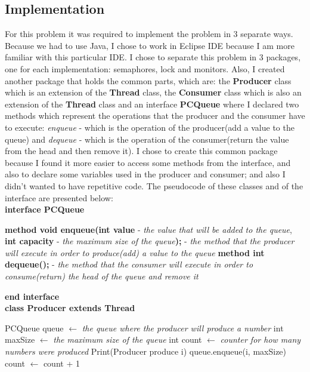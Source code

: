 \documentclass[14pt]{article}
\begin{document}
\subsection{Implementation}
For this problem it was required to implement the problem in 3 separate ways. Because we had to use Java, I chose to work in Eclipse IDE because I am more familiar with this particular IDE. I chose to separate this problem in 3 packages, one for each implementation: semaphores, lock and monitors. Also, I created another package that holds the common parts, which are: the \textbf{Producer} class which is an extension of the \textbf{Thread} class, the \textbf{Consumer} class which is also an extension of the \textbf{Thread} class and an interface \textbf{PCQueue} where I declared two methods which represent the operations that the producer and the consumer have to execute: \textit{enqueue} - which is the operation of the producer(add a value to the queue) and \textit{dequeue} - which is the operation of the consumer(return the value from the head and then remove it). I chose to create this common package because I found it more easier to access some methods from the interface, and also to declare some variables used in the producer and consumer; and also I didn't wanted to have repetitive code. The pseudocode of these classes and of the interface are presented below:
\vspace{2.5 mm}
\\\textbf{interface PCQueue}
\begin{algorithmic}
\State \textbf{method void enqueue(int value} - \textit{the value that will be added to the queue}, \textbf{int capacity} - \textit{the maximum size of the queue}\textbf{);} - \textit{the method that the producer will execute in order to produce(add) a value to the queue}
\vspace{1.5 mm}
\State \textbf{method int dequeue();} - \textit{the method that the consumer will execute in order to consume(return) the head of the queue and remove it}
\end{algorithmic}
\textbf{end interface}
\vspace{2.5 mm}
\\\textbf{class Producer extends Thread}
\begin{algorithmic}
\State PCQueue queue $\gets$ \textit{the queue where the producer will produce a number}
\State int maxSize $\gets$ \textit{the maximum size of the queue}
\State int count $\gets$ \textit{counter for how many numbers were produced}
        \State Print(Producer produce i)
        \State queue.enqueue(i, maxSize)
        \State count $\gets$ count + 1
    \EndFor
\EndFunction
\end{algorithmic}
\end{document}
